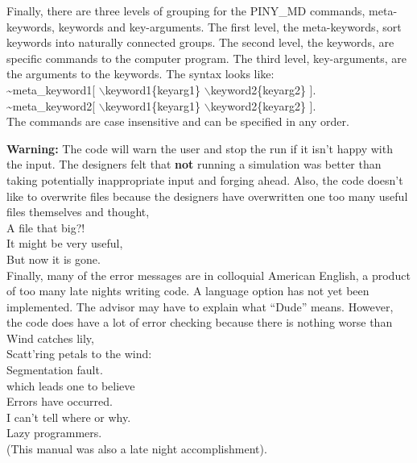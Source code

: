 Finally, there are three levels of grouping for the PINY\_MD commands, 
meta-keywords, keywords and key-arguments.
The first level, the meta-keywords, sort keywords into naturally
connected groups. The second level, the keywords, are specific
commands to the computer program. The third level, key-arguments,
are the arguments to the keywords.  The syntax looks like: \\ 
\hspace*{0.5in} \~{}meta\_keyword1[ $\backslash$keyword1\{keyarg1\}
$\backslash$keyword2\{keyarg2\} ]. \\
\hspace*{0.5in} \~{}meta\_keyword2[ $\backslash$keyword1\{keyarg1\}
$\backslash$keyword2\{keyarg2\} ]. \\
The commands are case insensitive and can be specified in any order.

{\bf Warning:} The code will warn the user and stop the run if it isn't happy
with the input. The designers felt that {\bf not} running a
simulation was better than taking potentially inappropriate input 
and forging ahead. 
Also, the code doesn't like to overwrite files because the designers
have overwritten one too many useful files themselves and thought,  \\
\hspace*{1.25in}  A file that big?! \\
\hspace*{1.25in}  It might be very useful,\\
\hspace*{1.25in}  But now it is gone.\\
Finally, many of the error messages are in colloquial American English, 
a product of too many late nights writing code. A language option has
not yet been implemented. The advisor may have to explain what
``Dude'' means.  However, the code does have a lot of error
checking because there is nothing worse than \\
\hspace*{1.25in}    Wind catches lily, \\
\hspace*{1.25in}    Scatt'ring petals to the wind:\\
\hspace*{1.25in}    Segmentation fault.\\
which leads one to believe \\
\hspace*{1.25in}  Errors have occurred. \\
\hspace*{1.25in}  I can't tell where or why.\\
\hspace*{1.25in}  Lazy programmers.\\
(This manual was also a late night accomplishment).


